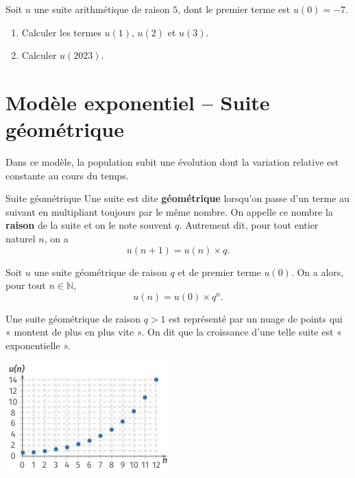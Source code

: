 \documentclass[11pt]{article}
\begin{document}
\begin{app}
  Soit $u$ une suite arithmétique de raison $5$, dont le premier terme est
  $u(0)=-7$.
  \begin{enumerate}
    \item Calculer les termes $u(1)$, $u(2)$ et $u(3)$.
    \item Calculer $u(2023)$.
  \end{enumerate}
\end{app}

\section{Modèle exponentiel -- Suite géométrique}

Dans ce modèle, la population subit une évolution dont la variation relative est
constante au cours du temps.

\begin{defi}{Suite géométrique}
  Une suite est dite \textbf{géométrique} lorsqu'on passe d'un terme au suivant
  en multipliant toujours par le même nombre. On appelle ce nombre la
  \textbf{raison} de la suite et on le note souvent $q$. Autrement dit, pour
  tout entier naturel $n$, on a
  \[
    u(n+1) = u(n) \times q.
  \]
\end{defi}

\begin{prop}
  Soit $u$ une suite géométrique de raison $q$ et de premier terme $u(0)$. On a
  alors, pour tout $n\in\mathbb{N}$,
  \[
    u(n) = u(0) \times q^n.
  \]
\end{prop}

\begin{prop}
  \begin{minipage}[]{.5\textwidth}
    Une suite géométrique de raison $q>1$ est représenté par un nuage de points
    qui « montent de plus en plus vite ». On dit que la croissance d'une telle
    suite est « exponentielle ».
  \end{minipage}
  \begin{minipage}[]{.5\textwidth}
    \begin{center}
      \includegraphics[scale=1]{geom.png}
    \end{center}
  \end{minipage}
\end{prop}
\end{document}
